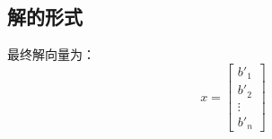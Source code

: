 \subsection{解的形式}
最终解向量为：
\[
x = \begin{bmatrix}
b'_1 \\ b'_2 \\ \vdots \\ b'_n
\end{bmatrix}
\]























\ifx\allfiles\undefined

\fi